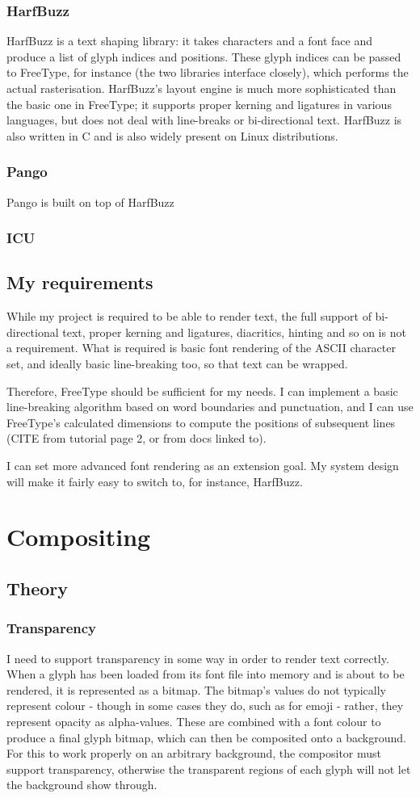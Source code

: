 \documentclass[12pt]{article}
\begin{document}
   \subsubsection{HarfBuzz}
    HarfBuzz is a text shaping library: it takes characters and a font face and produce a list of glyph indices and positions. These glyph indices can be passed to FreeType, for instance (the two libraries interface closely), which performs the actual rasterisation. HarfBuzz's layout engine is much more sophisticated than the basic one in FreeType; it supports proper kerning and ligatures in various languages, but does not deal with line-breaks or bi-directional text. HarfBuzz is also written in C and is also widely present on Linux distributions.
   \subsubsection{Pango}
    Pango is built on top of HarfBuzz 
   \subsubsection{ICU}
  \subsection{My requirements}
   While my project is required to be able to render text, the full support of bi-directional text, proper kerning and ligatures, diacritics, hinting and so on is not a requirement. What is required is basic font rendering of the ASCII character set, and ideally basic line-breaking too, so that text can be wrapped.

   Therefore, FreeType should be sufficient for my needs. I can implement a basic line-breaking algorithm based on word boundaries and punctuation, and I can use FreeType's calculated dimensions to compute the positions of subsequent lines (CITE from tutorial page 2, or from docs linked to).

   I can set more advanced font rendering as an extension goal. My system design will make it fairly easy to switch to, for instance, HarfBuzz.
 \section{Compositing}
  \subsection{Theory}
   \subsubsection{Transparency}
    I need to support transparency in some way in order to render text correctly. When a glyph has been loaded from its font file into memory and is about to be rendered, it is represented as a bitmap. The bitmap's values do not typically represent colour - though in some cases they do, such as for emoji - rather, they represent opacity as alpha-values. These are combined with a font colour to produce a final glyph bitmap, which can then be composited onto a background. For this to work properly on an arbitrary background, the compositor must support transparency, otherwise the transparent regions of each glyph will not let the background show through.
\end{document}
